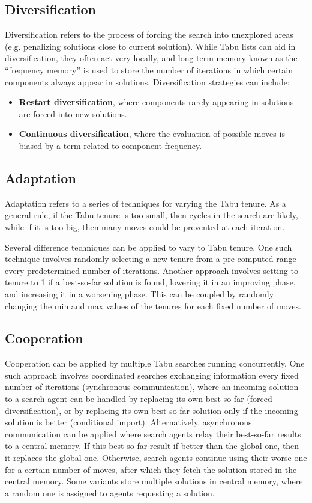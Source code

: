 \documentclass[12pt,titlepage]{article}
\begin{document}
    \subsection{Diversification}
      Diversification refers to the process of forcing the search into unexplored areas (e.g. penalizing solutions close to current solution). While Tabu lists can aid
      in diversification, they often act very locally, and long-term memory known as the ``frequency memory'' is used to store the number of iterations in which certain
      components always appear in solutions. Diversification strategies can include:
      \begin{itemize}
        \item \textbf{Restart diversification}, where components rarely appearing in solutions are forced into new solutions.
        \item \textbf{Continuous diversification}, where the evaluation of possible moves is biased by a term related to component frequency.
      \end{itemize}

    \subsection{Adaptation}
      Adaptation refers to a series of techniques for varying the Tabu tenure. As a general rule, if the Tabu tenure is too small, then cycles in the search are likely,
      while if it is too big, then many moves could be prevented at each iteration.

      Several difference techniques can be applied to vary to Tabu tenure. One such technique involves randomly selecting a new tenure from a pre-computed range every
      predetermined number of iterations. Another approach involves setting to tenure to 1 if a best-so-far solution is found, lowering it in an improving phase, and
      increasing it in a worsening phase. This can be coupled by randomly changing the min and max values of the tenures for each fixed number of moves.

    \subsection{Cooperation}
      Cooperation can be applied by multiple Tabu searches running concurrently. One such approach involves coordinated searches exchanging information every fixed number
      of iterations (synchronous communication), where an incoming solution to a search agent can be handled by replacing its own best-so-far (forced diversification),
      or by replacing its own best-so-far solution only if the incoming solution is better (conditional import). Alternatively, asynchronous communication can be applied
      where search agents relay their best-so-far results to a central memory. If this best-so-far result if better than the global one, then it replaces the global one.
      Otherwise, search agents continue using their worse one for a certain number of moves, after which they fetch the solution stored in the central memory. Some variants
      store multiple solutions in central memory, where a random one is assigned to agents requesting a solution.
\end{document}
